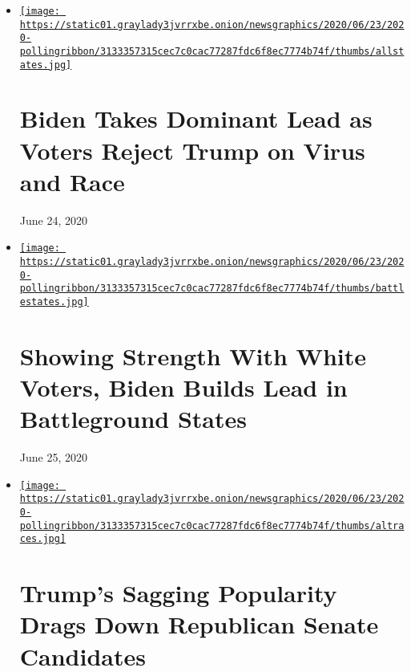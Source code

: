 \begin{itemize}
\item
  \href{https://www.nytimes3xbfgragh.onion/2020/06/24/us/politics/trump-biden-poll-nyt-upshot-siena-college.html}{\texttt{[image: https://static01.graylady3jvrrxbe.onion/newsgraphics/2020/06/23/2020-pollingribbon/3133357315cec7c0cac77287fdc6f8ec7774b74f/thumbs/allstates.jpg]}}

  \href{https://www.nytimes3xbfgragh.onion/2020/06/24/us/politics/trump-biden-poll-nyt-upshot-siena-college.html}{}

  \hypertarget{biden-takes-dominant-lead-as-voters-reject-trump-on-virus-and-race}{%
  \section{Biden Takes Dominant Lead as Voters Reject Trump on Virus and
  Race}\label{biden-takes-dominant-lead-as-voters-reject-trump-on-virus-and-race}}

  June 24, 2020
\item
  \href{https://www.nytimes3xbfgragh.onion/2020/06/25/upshot/poll-2020-biden-battlegrounds.html}{\texttt{[image: https://static01.graylady3jvrrxbe.onion/newsgraphics/2020/06/23/2020-pollingribbon/3133357315cec7c0cac77287fdc6f8ec7774b74f/thumbs/battlestates.jpg]}}

  \href{https://www.nytimes3xbfgragh.onion/2020/06/25/upshot/poll-2020-biden-battlegrounds.html}{}

  \hypertarget{showing-strength-with-white-voters-biden-builds-lead-in-battleground-states}{%
  \section{Showing Strength With White Voters, Biden Builds Lead in
  Battleground
  States}\label{showing-strength-with-white-voters-biden-builds-lead-in-battleground-states}}

  June 25, 2020
\item
  \href{https://www.nytimes3xbfgragh.onion/2020/06/25/us/politics/trump-senate-republicans-poll.html}{\texttt{[image: https://static01.graylady3jvrrxbe.onion/newsgraphics/2020/06/23/2020-pollingribbon/3133357315cec7c0cac77287fdc6f8ec7774b74f/thumbs/altraces.jpg]}}

  \href{https://www.nytimes3xbfgragh.onion/2020/06/25/us/politics/trump-senate-republicans-poll.html}{}

  \hypertarget{trumps-sagging-popularity-drags-down-republican-senate-candidates}{%
  \section{Trump's Sagging Popularity Drags Down Republican Senate
  Candidates}\label{trumps-sagging-popularity-drags-down-republican-senate-candidates}}


\end{itemize}

